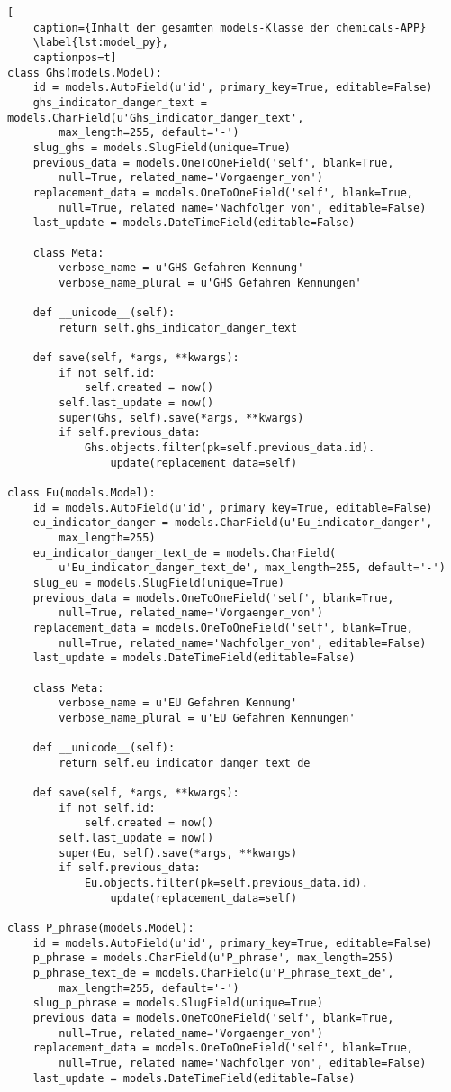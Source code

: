 \begin{lstlisting}[
    caption={Inhalt der gesamten models-Klasse der chemicals-APP}
    \label{lst:model_py},
    captionpos=t]
class Ghs(models.Model):
    id = models.AutoField(u'id', primary_key=True, editable=False) 
    ghs_indicator_danger_text = models.CharField(u'Ghs_indicator_danger_text', 
        max_length=255, default='-')    
    slug_ghs = models.SlugField(unique=True)
    previous_data = models.OneToOneField('self', blank=True, 
        null=True, related_name='Vorgaenger_von')
    replacement_data = models.OneToOneField('self', blank=True, 
        null=True, related_name='Nachfolger_von', editable=False)
    last_update = models.DateTimeField(editable=False)

    class Meta:
        verbose_name = u'GHS Gefahren Kennung'
        verbose_name_plural = u'GHS Gefahren Kennungen'

    def __unicode__(self):
        return self.ghs_indicator_danger_text

    def save(self, *args, **kwargs):
        if not self.id:
            self.created = now()
        self.last_update = now()
        super(Ghs, self).save(*args, **kwargs)
        if self.previous_data:
            Ghs.objects.filter(pk=self.previous_data.id).
                update(replacement_data=self)

class Eu(models.Model):
    id = models.AutoField(u'id', primary_key=True, editable=False)
    eu_indicator_danger = models.CharField(u'Eu_indicator_danger', 
        max_length=255)
    eu_indicator_danger_text_de = models.CharField(
        u'Eu_indicator_danger_text_de', max_length=255, default='-')
    slug_eu = models.SlugField(unique=True)
    previous_data = models.OneToOneField('self', blank=True, 
        null=True, related_name='Vorgaenger_von')
    replacement_data = models.OneToOneField('self', blank=True, 
        null=True, related_name='Nachfolger_von', editable=False)
    last_update = models.DateTimeField(editable=False)

    class Meta:
        verbose_name = u'EU Gefahren Kennung'
        verbose_name_plural = u'EU Gefahren Kennungen'

    def __unicode__(self):
        return self.eu_indicator_danger_text_de

    def save(self, *args, **kwargs):
        if not self.id:
            self.created = now()
        self.last_update = now()
        super(Eu, self).save(*args, **kwargs)
        if self.previous_data:
            Eu.objects.filter(pk=self.previous_data.id).
                update(replacement_data=self)

class P_phrase(models.Model):
    id = models.AutoField(u'id', primary_key=True, editable=False)
    p_phrase = models.CharField(u'P_phrase', max_length=255)
    p_phrase_text_de = models.CharField(u'P_phrase_text_de', 
        max_length=255, default='-')
    slug_p_phrase = models.SlugField(unique=True)
    previous_data = models.OneToOneField('self', blank=True, 
        null=True, related_name='Vorgaenger_von')
    replacement_data = models.OneToOneField('self', blank=True, 
        null=True, related_name='Nachfolger_von', editable=False)
    last_update = models.DateTimeField(editable=False)


\end{lstlisting}
